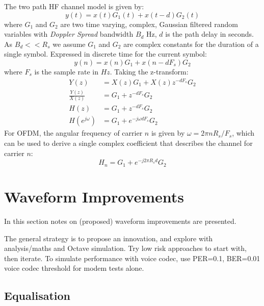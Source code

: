 \documentclass{article}
\begin{document}
The two path HF channel model \cite{itu1487} is given by:
\begin{equation}
y(t) = x(t)G_1(t) + x(t-d)G_2(t)
\end{equation}
where $G_1$ and $G_2$ are two time varying, complex, Gaussian filtered random variables with \emph{Doppler Spread} bandwidth $B_d$ Hz, $d$ is the path delay in seconds. As $B_d<< R_s$ we assume $G_1$ and $G_2$ are complex constants for the duration of a single symbol. Expressed in discrete time for the current symbol:
\begin{equation}
y(n) = x(n)G_1 + x(n-dF_s)G_2
\end{equation}
where $F_s$ is the sample rate in $\si{Hz}$.  Taking the z-transform:
\begin{equation}
\begin{split}
Y(z) &= X(z)G_1+X(z)z^{-dF_s}G_2 \\
\frac{Y(z)}{X(z)} &= G_1+z^{-dF_s}G_2 \\
H(z) &= G_1+z^{-dF_s}G_2 \\
H(e^{j \omega}) &= G_1+e^{-j \omega d F_s}G_2
\end{split}
\end{equation}
For OFDM, the angular frequency of carrier $n$ is given by $\omega=2 \pi n R_s/F_s$, which can be used to derive a single complex coefficient that describes the channel for carrier $n$:
\begin{equation}
\label{eq:hf_model}
H_n = G_1+e^{-j 2 \pi R_s d}G_2
\end{equation} 

\section{Waveform Improvements}

In this section notes on (proposed) waveform improvements are presented.

The general strategy is to propose an innovation, and explore with analysis/maths and Octave simulation. Try low risk approaches to start with, then iterate.  To simulate performance with voice codec, use PER=0.1, BER=0.01 voice codec threshold for modem tests alone.

\subsection{Equalisation}
\end{document}
